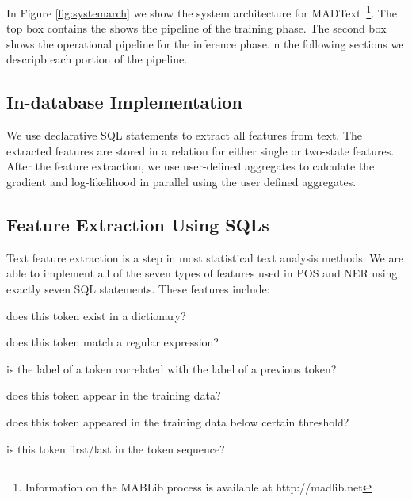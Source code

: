 \documentclass[11pt,letterpaper]{article}
\begin{document}
In Figure \ref{fig:systemarch} we show the system architecture for MADText~\footnote{Information on the MABLib process is available at http://madlib.net}. 
The top box contains the shows  the pipeline of the training phase. 
The second box shows the operational pipeline for the inference phase.
n the following sections we descripb each portion of the pipeline.

\subsection{In-database Implementation}
We use declarative SQL statements to extract all features from text.
The extracted features are stored in a relation for either single or two-state features.
After the feature extraction, we use user-defined aggregates to calculate the gradient and log-likelihood in parallel using the user defined aggregates.


\subsection{Feature Extraction Using SQLs}
Text feature extraction is a step in most statistical text analysis methods.
We are able to implement all of the seven types of features used in POS and NER using exactly seven 
SQL statements. These features include: 
\begin{description}[noitemsep]
\item[Dictionary:] does this token exist in a dictionary? 
\item[Regex:] does this token match a regular expression? 
\item[Edge:] is the label of a token correlated with the label of a previous token? 
\item[Word:] does this token appear in the training data?
\item[Unknown:] does this token appeared in the training data below certain threshold? 
\item[Start/End:] is this token first/last in the token sequence?
\end{description}
\end{document}
